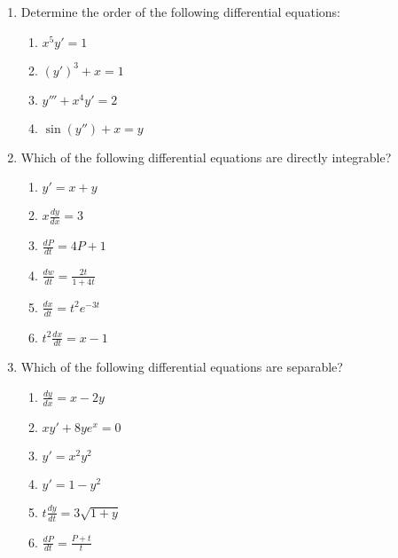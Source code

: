 \documentclass{nosvagor-notes}
\begin{document}
\begin{enumerate}
  \item Determine the order of the following differential equations:
    \begin{multicols}{2}
      \begin{enumerate}
        \item \(x^5y'=1\)
        \item \((y')^3+x=1\)
        \item \(y''' + x^4y' = 2\)
        \item \(\sin (y'') + x = y\)
      \end{enumerate}
    \end{multicols}
    \vspace{80pt}

  \item Which of the following differential equations are directly integrable?
  \begin{multicols}{2}
    \begin{enumerate}
      \item \(y'=x+y\)
      \item \(x \frac{dy}{dx} = 3\)
      \item \(\frac{dP}{dt} = 4P + 1\)
      \item \(\frac{dw}{dt} = \frac{2t}{1+4t}\)
      \item \(\frac{dx}{dt} = t^2 e^{-3t}\)
      \item \(t^2 \frac{dx}{dt} = x - 1\)
    \end{enumerate}
  \end{multicols}

  \newpage

  \item Which of the following differential equations are separable?
  \begin{multicols}{2}
    \begin{enumerate}
      \item \(\frac{dy}{dx} = x - 2y\)
      \item \(xy' + 8ye^x = 0\)
      \item \(y' = x^2y^2\)
      \item \(y' = 1-y^2\)
      \item \(t \frac{dy}{dt} = 3 \sqrt{1+y} \)
      \item \(\frac{dP}{dt} = \frac{P+t}{t}\)
    \end{enumerate}
  \end{multicols}
  \vspace{256pt}


\end{enumerate}
\end{document}
